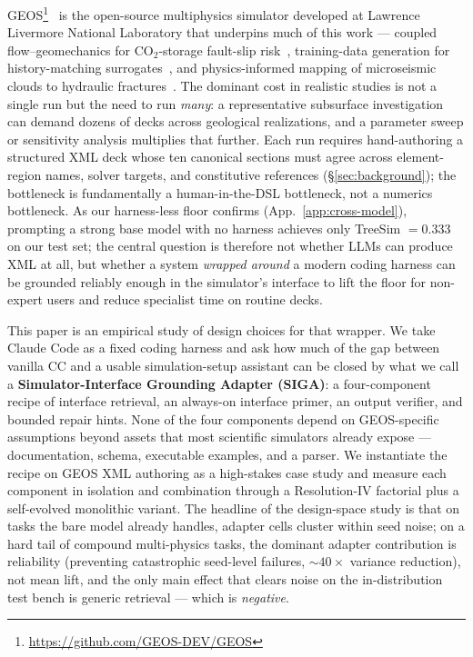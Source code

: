 \documentclass{article}
\begin{document}
GEOS\footnote{\url{https://github.com/GEOS-DEV/GEOS}}~\citep{geos2024} is the open-source multiphysics simulator developed at Lawrence Livermore National Laboratory that underpins much of this work --- coupled flow--geomechanics for CO$_2$-storage fault-slip risk~\citep{he2026faultslip}, training-data generation for history-matching surrogates~\citep{han2024accelerated}, and physics-informed mapping of microseismic clouds to hydraulic fractures~\citep{glubokovskikh2023microseismic}. The dominant cost in realistic studies is not a single run but the need to run \emph{many}: a representative subsurface investigation can demand dozens of decks across geological realizations, and a parameter sweep or sensitivity analysis multiplies that further. Each run requires hand-authoring a structured XML deck whose ten canonical sections must agree across element-region names, solver targets, and constitutive references (\S\ref{sec:background}); the bottleneck is fundamentally a human-in-the-DSL bottleneck, not a numerics bottleneck. As our harness-less floor confirms (App.~\ref{app:cross-model}), prompting a strong base model with no harness achieves only TreeSim $= 0.333$ on our test set; the central question is therefore not whether LLMs can produce XML at all, but whether a system \emph{wrapped around} a modern coding harness can be grounded reliably enough in the simulator's interface to lift the floor for non-expert users and reduce specialist time on routine decks.

This paper is an empirical study of design choices for that wrapper. We take Claude Code as a fixed coding harness and ask how much of the gap between vanilla CC and a usable simulation-setup assistant can be closed by what we call a \textbf{Simulator-Interface Grounding Adapter (SIGA)}: a four-component recipe of interface retrieval, an always-on interface primer, an output verifier, and bounded repair hints. None of the four components depend on GEOS-specific assumptions beyond assets that most scientific simulators already expose --- documentation, schema, executable examples, and a parser. We instantiate the recipe on GEOS XML authoring as a high-stakes case study and measure each component in isolation and combination through a Resolution-IV factorial plus a self-evolved monolithic variant. The headline of the design-space study is that on tasks the bare model already handles, adapter cells cluster within seed noise; on a hard tail of compound multi-physics tasks, the dominant adapter contribution is reliability (preventing catastrophic seed-level failures, ${\sim}40{\times}$ variance reduction), not mean lift, and the only main effect that clears noise on the in-distribution test bench is generic retrieval --- which is \emph{negative}.
\end{document}
